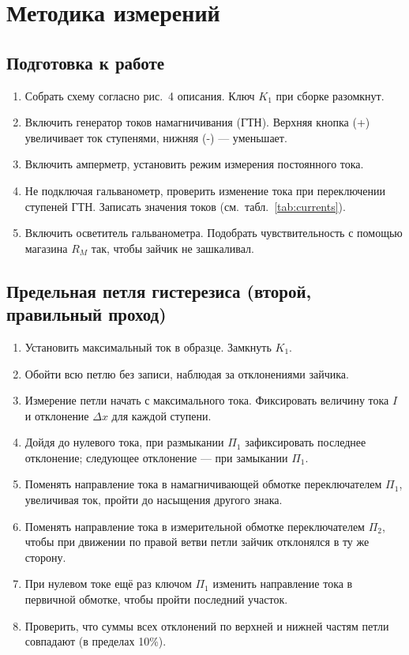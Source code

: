 \documentclass[a4paper]{article}
\begin{document}
\section{Методика измерений}

\subsection{Подготовка к работе}

\begin{enumerate}
	\item Собрать схему согласно рис.~4 описания. Ключ $K_1$ при сборке разомкнут.
	\item Включить генератор токов намагничивания (ГТН). Верхняя кнопка (+) увеличивает ток ступенями, нижняя (-) — уменьшает.
	\item Включить амперметр, установить режим измерения постоянного тока.
	\item Не подключая гальванометр, проверить изменение тока при переключении ступеней ГТН. Записать значения токов (см.~табл.~\ref{tab:currents}).
	\item Включить осветитель гальванометра. Подобрать чувствительность с помощью магазина $R_M$ так, чтобы зайчик не зашкаливал.
\end{enumerate}

\subsection{Предельная петля гистерезиса (второй, правильный проход)}

\begin{enumerate}
	\item Установить максимальный ток в образце. Замкнуть $K_1$.
	\item Обойти всю петлю без записи, наблюдая за отклонениями зайчика.
	\item Измерение петли начать с максимального тока. Фиксировать величину тока $I$ и отклонение $\Delta x$ для каждой ступени.
	\item Дойдя до нулевого тока, при размыкании $\Pi_1$ зафиксировать последнее отклонение; следующее отклонение — при замыкании $\Pi_1$.
	\item Поменять направление тока в намагничивающей обмотке переключателем $\Pi_1$, увеличивая ток, пройти до насыщения другого знака.
	\item Поменять направление тока в измерительной обмотке переключателем $\Pi_2$, чтобы при движении по правой ветви петли зайчик отклонялся в ту же сторону.
	\item При нулевом токе ещё раз ключом $\Pi_1$ изменить направление тока в первичной обмотке, чтобы пройти последний участок.
	\item Проверить, что суммы всех отклонений по верхней и нижней частям петли совпадают (в пределах 10\%).
\end{enumerate}
\end{document}
